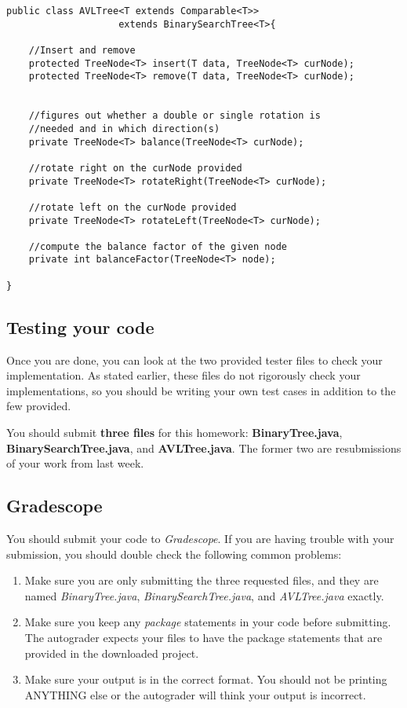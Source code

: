 \documentclass[paper=a4, fontsize=11pt, parskip=full]{scrartcl} %
\numberwithin{equation}{section} %
\numberwithin{figure}{section} %
\numberwithin{table}{section} %
\begin{document}
\begin{lstlisting}
public class AVLTree<T extends Comparable<T>>
					extends BinarySearchTree<T>{

	//Insert and remove
	protected TreeNode<T> insert(T data, TreeNode<T> curNode);
	protected TreeNode<T> remove(T data, TreeNode<T> curNode);


	//figures out whether a double or single rotation is
	//needed and in which direction(s)
	private TreeNode<T> balance(TreeNode<T> curNode);
			
	//rotate right on the curNode provided
	private TreeNode<T> rotateRight(TreeNode<T> curNode);
	
	//rotate left on the curNode provided
	private TreeNode<T> rotateLeft(TreeNode<T> curNode);
	
	//compute the balance factor of the given node
	private int balanceFactor(TreeNode<T> node);

}
\end{lstlisting}


\subsection{Testing your code}

Once you are done, you can look at the two provided tester files to check your implementation. As stated earlier, these files do not rigorously check your implementations, so you should be writing your own test cases in addition to the few provided.

You should submit \textbf{three files} for this homework: \textbf{BinaryTree.java}, \textbf{BinarySearchTree.java}, and \textbf{AVLTree.java}. The former two are resubmissions of your work from last week.

\subsection{Gradescope}

You should submit your code to \emph{Gradescope}. If you are having trouble with your submission, you should double check the following common problems:

\begin{enumerate}
	\item Make sure you are only submitting the three requested files, and they are named \emph{BinaryTree.java}, \emph{BinarySearchTree.java}, and \emph{AVLTree.java} exactly.
	\item Make sure you keep any \emph{package} statements in your code before submitting. The autograder expects your files to have the package statements that are provided in the downloaded project.
	\item Make sure your output is in the correct format. You should not be printing ANYTHING else or the autograder will think your output is incorrect.
\end{enumerate}



\end{document}

